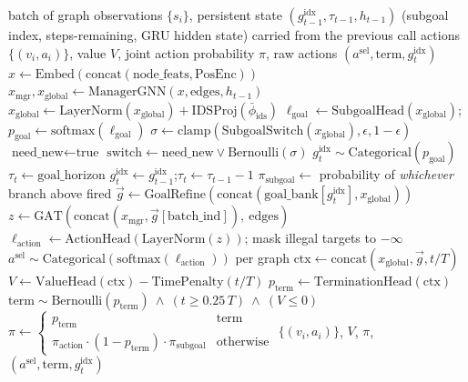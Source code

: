 \documentclass[11pt]{article}
\newcommand{\code}[1]{\texttt{#1}}
\begin{document}
\begin{algorithm}[H]
\caption{\code{NASimNetDHRL.forward} -- Manager--Worker Hierarchical Policy Step}
\label{alg:forward}
\begin{algorithmic}[1]
\Require batch of graph observations $\{s_i\}$, persistent state
  $(g^{\text{idx}}_{t-1}, \tau_{t-1}, h_{t-1})$ (subgoal index, steps-remaining, GRU
  hidden state) carried from the previous call
\Ensure actions $\{(v_i, a_i)\}$, value $V$, joint action probability $\pi$, raw
  actions $(a^{\text{sel}}, \text{term}, g^{\text{idx}}_t)$
\State $x \gets \text{Embed}(\text{concat}(\text{node\_feats}, \text{PosEnc}))$
\State $x_{\text{mgr}}, x_{\text{global}} \gets \text{ManagerGNN}(x, \text{edges}, h_{t-1})$
\State $x_{\text{global}} \gets \text{LayerNorm}(x_{\text{global}}) + \text{IDSProj}(\bar\phi_{\text{ids}})$
\State $\ell_{\text{goal}} \gets \text{SubgoalHead}(x_{\text{global}})$;\quad
       $p_{\text{goal}} \gets \text{softmax}(\ell_{\text{goal}})$
\State $\sigma \gets \text{clamp}(\text{SubgoalSwitch}(x_{\text{global}}), \epsilon, 1-\epsilon)$
 
  \State $\text{need\_new} \gets \text{true}$
\EndIf
\State $\text{switch} \gets \text{need\_new} \lor \text{Bernoulli}(\sigma)$ 
  \State $g^{\text{idx}}_t \sim \text{Categorical}(p_{\text{goal}})$ 
  \State $\tau_t \gets \text{goal\_horizon}$ 
\Else
  \State $g^{\text{idx}}_t \gets g^{\text{idx}}_{t-1}$;\quad $\tau_t \gets \tau_{t-1} - 1$
\EndIf
\State $\pi_{\text{subgoal}} \gets$ probability of \emph{whichever} branch above fired
\State $\vec g \gets \text{GoalRefine}(\text{concat}(\text{goal\_bank}[g^{\text{idx}}_t], x_{\text{global}}))$
\State $z \gets \text{GAT}(\text{concat}(x_{\text{mgr}}, \vec g[\text{batch\_ind}]),\ \text{edges})$
\State $\ell_{\text{action}} \gets \text{ActionHead}(\text{LayerNorm}(z))$; mask illegal targets to $-\infty$
\State $a^{\text{sel}} \sim \text{Categorical}(\text{softmax}(\ell_{\text{action}}))$ per graph 
\State $\text{ctx} \gets \text{concat}(x_{\text{global}}, \vec g, t/T)$
\State $V \gets \text{ValueHead}(\text{ctx}) - \text{TimePenalty}(t/T)$
\State $p_{\text{term}} \gets \text{TerminationHead}(\text{ctx})$
\State $\text{term} \sim \text{Bernoulli}(p_{\text{term}}) \ \land\ (t \ge 0.25\,T) \ \land\ (V \le 0)$
\State $\pi \gets \begin{cases} p_{\text{term}} & \text{term} \\
  \pi_{\text{action}} \cdot (1-p_{\text{term}}) \cdot \pi_{\text{subgoal}} & \text{otherwise}\end{cases}$
\State \Return $\{(v_i, a_i)\}$, $V$, $\pi$, $(a^{\text{sel}}, \text{term}, g^{\text{idx}}_t)$
\end{algorithmic}
\end{algorithm}
\end{document}
